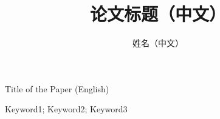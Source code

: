 \documentclass{styles/xmu}
\begin{document}

\title{论文标题（中文）}{Title of the Paper (English)}
\author{姓名（中文）}
\subject{专业名称}


         {Keyword1; Keyword2; Keyword3}

\maketitle

\begin{abstract}
    
\end{abstract}

\begin{enabstract}
    
\end{enabstract}

\tableofcontents






\begin{reference}
    \nocite{*}  %
    
\end{reference}

\begin{acknowledgement}
    
\end{acknowledgement}
\end{document}
